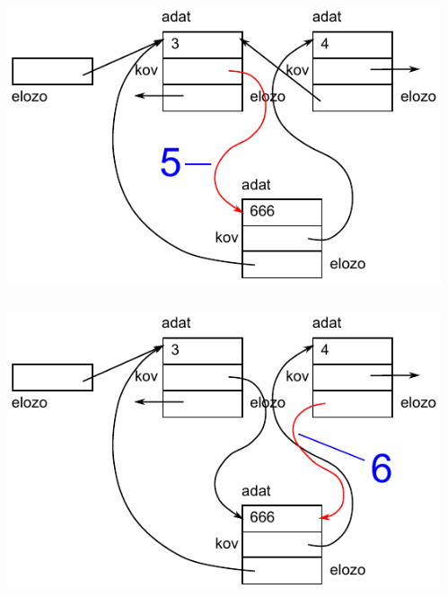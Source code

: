 \begin{frame}
  \begin{columns}[c]
      \scriptsize
      \begin{exampleblock}{}
        \vspace{-.2cm}
        
        \vspace{-.2cm}
    \end{exampleblock}
      \includegraphics[width=\textwidth]{lista2/list2-5.pdf}
  \end{columns}
\end{frame}

\begin{frame}
  \begin{columns}[c]
      \scriptsize
      \begin{exampleblock}{}
        \vspace{-.2cm}
        
        \vspace{-.2cm}
    \end{exampleblock}
      \includegraphics[width=\textwidth]{lista2/list2-6.pdf}
  \end{columns}
\end{frame}
